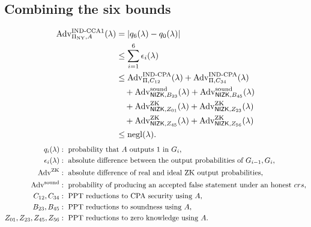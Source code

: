 \documentclass[12pt,a4paper]{article}
\begin{document}
\clearpage
\subsection*{Combining the six bounds}
\[
\begin{aligned}
\operatorname{Adv}^{\mathrm{IND\text{-}CCA1}}_{\Pi_{\mathrm{NY}},A}(\lambda)
&=|q_6(\lambda)-q_0(\lambda)|\\
&\leq\sum_{i=1}^{6}\epsilon_i(\lambda)\\
&\leq\operatorname{Adv}^{\mathrm{IND\text{-}CPA}}_{\Pi,C_{12}}(\lambda)
+\operatorname{Adv}^{\mathrm{IND\text{-}CPA}}_{\Pi,C_{34}}(\lambda)\\
&\quad+\operatorname{Adv}^{\mathrm{sound}}_{\mathsf{NIZK},B_{23}}(\lambda)
+\operatorname{Adv}^{\mathrm{sound}}_{\mathsf{NIZK},B_{45}}(\lambda)\\
&\quad+\operatorname{Adv}^{\mathrm{ZK}}_{\mathsf{NIZK},Z_{01}}(\lambda)
+\operatorname{Adv}^{\mathrm{ZK}}_{\mathsf{NIZK},Z_{23}}(\lambda)\\
&\quad+\operatorname{Adv}^{\mathrm{ZK}}_{\mathsf{NIZK},Z_{45}}(\lambda)
+\operatorname{Adv}^{\mathrm{ZK}}_{\mathsf{NIZK},Z_{56}}(\lambda)\\
&\leq\operatorname{negl}(\lambda).
\end{aligned}
\]
\[
\begin{aligned}
q_i(\lambda)&:\text{ probability that }A\text{ outputs }1\text{ in }G_i,\\
\epsilon_i(\lambda)&:\text{ absolute difference between the output probabilities of }G_{i-1},G_i,\\
\operatorname{Adv}^{\mathrm{ZK}}&:\text{ absolute difference of real and ideal ZK output probabilities},\\
\operatorname{Adv}^{\mathrm{sound}}&:\text{ probability of producing an accepted false statement under an honest }crs,\\
C_{12},C_{34}&:\text{ PPT reductions to CPA security using }A,\\
B_{23},B_{45}&:\text{ PPT reductions to soundness using }A,\\
Z_{01},Z_{23},Z_{45},Z_{56}&:\text{ PPT reductions to zero knowledge using }A.
\end{aligned}
\]
\end{document}
